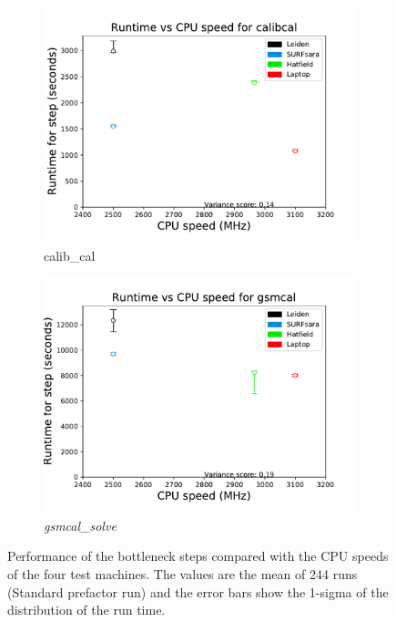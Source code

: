 \begin{figure}
\begin{minipage}[b]{0.45\textwidth}
\begin{subfigure}[b]{\linewidth}
    \includegraphics[width=\textwidth]{ch4/figures/fig7/calibcalCPU.pdf}
      \caption{calib\_cal }
	\label{calib_cal_CPU}
 \end{subfigure}%

\vspace*{5mm} %
\begin{subfigure}[b]{\linewidth}
    \includegraphics[width=\textwidth]{ch4/figures/fig7/gsmcalCPU.pdf}
      \caption{\textit{gsmcal\_solve}}
	\label{gsmcal_CPU}
 \end{subfigure}
 \label{CPU_3_steps}
 \caption{Performance of the bottleneck steps compared with the CPU speeds of the four test machines. The values are the mean of 244 runs (Standard prefactor run) and the error bars show the 1-sigma of the distribution of the run time. } 
\end{minipage}
\hfill        %
\end{figure}


